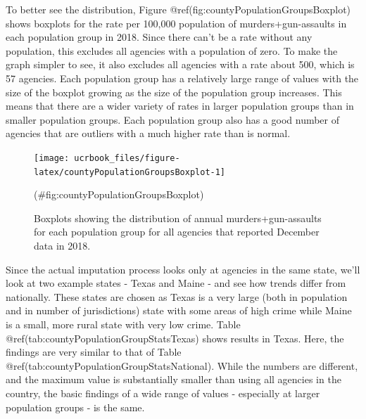 \documentclass[
  12pt,
  openany]{book}
\begin{document}
To better see the distribution, Figure @ref(fig:countyPopulationGroupsBoxplot) shows boxplots for the rate per 100,000 population of murders+gun-assaults in each population group in 2018. Since there can't be a rate without any population, this excludes all agencies with a population of zero. To make the graph simpler to see, it also excludes all agencies with a rate about 500, which is 57 agencies. Each population group has a relatively large range of values with the size of the boxplot growing as the size of the population group increases. This means that there are a wider variety of rates in larger population groups than in smaller population groups. Each population group also has a good number of agencies that are outliers with a much higher rate than is normal.

\begin{figure}

{\centering \texttt{[image: ucrbook\_files/figure-latex/countyPopulationGroupsBoxplot-1]} 

}

\caption{Boxplots showing the distribution of annual murders+gun-assaults for each population group for all agencies that reported December data in 2018.}(\#fig:countyPopulationGroupsBoxplot)
\end{figure}

Since the actual imputation process looks only at agencies in the same state, we'll look at two example states - Texas and Maine - and see how trends differ from nationally. These states are chosen as Texas is a very large (both in population and in number of jurisdictions) state with some areas of high crime while Maine is a small, more rural state with very low crime. Table @ref(tab:countyPopulationGroupStatsTexas) shows results in Texas. Here, the findings are very similar to that of Table @ref(tab:countyPopulationGroupStatsNational). While the numbers are different, and the maximum value is substantially smaller than using all agencies in the country, the basic findings of a wide range of values - especially at larger population groups - is the same.
\end{document}
